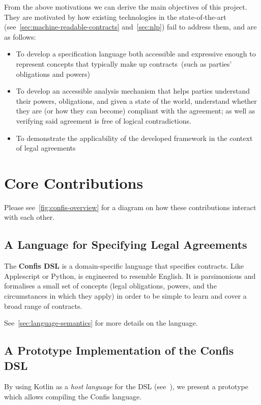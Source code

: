 From the above motivations we can derive the main objectives of this project.
They are motivated by how existing technologies in the state-of-the-art (see~\autoref{sec:machine-readable-contracts} and~\autoref{sec:nlp}) fail to address them, and are as follows:
\begin{itemize}
    \item To develop a specification language both accessible and expressive enough to represent concepts that typically make up contracts~(such as parties' obligations and powers)

    \item To develop an accessible analysis mechanism that helps parties understand their powers, obligations, and given a state of the world, understand whether they are (or how they can become) compliant with the agreement;
    as well as verifying said agreement is free of logical contradictions.

    \item To demonstrate the applicability of the developed framework in the context of legal agreements
\end{itemize}


\section{Core Contributions}\label{sec:core-contributions}

Please see~\autoref{fig:confis-overview} for a diagram on how these contributions interact with each other.

\subsection{A Language for Specifying Legal Agreements}
The \textbf{Confis DSL} is a domain-specific language that specifies contracts.
Like Applescript or Python, is engineered to resemble English.
It is parsimonious and formalises a small set of concepts (legal obligations, powers, and the circumstances in which they apply) in order to be simple to learn and cover a broad range of contracts.

See~\autoref{sec:language-semantics} for more details on the language.

\subsection{A Prototype Implementation of the Confis DSL}
By using Kotlin as a \emph{host language} for the DSL (see~), we present a prototype which allows compiling the Confis language.

